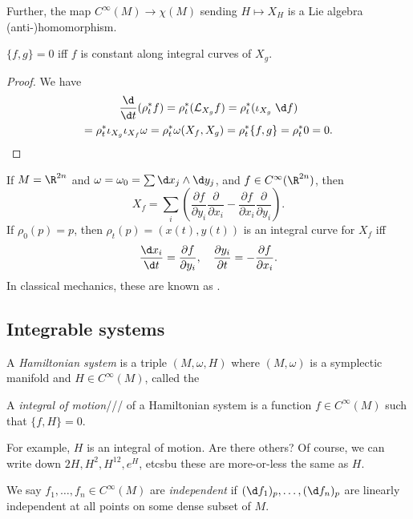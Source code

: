 \documentclass[a4paper]{article}
\begin{document}
Further, the map $C^\infty(M) \to \chi(M)$ sending $H \mapsto X_H$ is a Lie algebra (anti-)homomorphism.

\begin{prop}
  $\{f, g\} = 0$ iff $f$ is constant along integral curves of $X_g$.
\end{prop}

\begin{proof}
  We have
  \begin{multline*}
    \frac{\d}{\d t} (\rho_t^* f) = \rho_t^* (\mathcal{L}_{X_g} f) = \rho_t^* (\iota_{X_g}\;\d f) \\
    = \rho_t^* \iota_{X_g} \iota_{X_f} \omega = \rho_t^* \omega(X_f, X_g) = \rho_t^* \{f, g\} = \rho_t^* 0 = 0.\qedhere
  \end{multline*}
\end{proof}

\begin{eg}
  If $M = \R^{2n}$ and $\omega = \omega_0 = \sum \d x_j \wedge \d y_j$, and $f \in C^\infty(\R^{2n})$, then
  \[
    X_f = \sum_i \left(\frac{\partial f}{\partial y_i} \frac{\partial}{\partial x_i} - \frac{\partial f}{\partial x_i} \frac{\partial }{\partial y_i}\right).
  \]
  If $\rho_0(p) = p$, then $\rho_t(p) = (x(t), y(t))$ is an integral curve for $X_f$ iff
  \[
    \frac{\d x_i}{\d t} = \frac{\partial f}{\partial y_i},\quad \frac{\partial y_i}{\partial t} = -\frac{\partial f}{\partial x_i}.
  \]
  In classical mechanics, these are known as .
\end{eg}

\subsection{Integrable systems}
\begin{defi}
  A \emph{Hamiltonian system} is a triple $(M, \omega, H)$ where $(M, \omega)$ is a symplectic manifold and $H \in C^\infty(M)$, called the 
\end{defi}

\begin{defi}
  A \emph{integral of motion}/// of a Hamiltonian system is a function $f \in C^\infty(M)$ such that $\{f, H\} = 0$.
\end{defi}
For example, $H$ is an integral of motion. Are there others? Of course, we can write down $2H, H^2, H^{12}, e^H$, etcsbu these are more-or-less the same as $H$.
\begin{defi}
  We say $f_1, \ldots, f_n \in C^\infty(M)$ are \emph{independent} if $(\d f_1)_p, \ldots, (\d f_n)_p$ are linearly independent at all points on some dense subset of $M$.
\end{defi}
\end{document}
